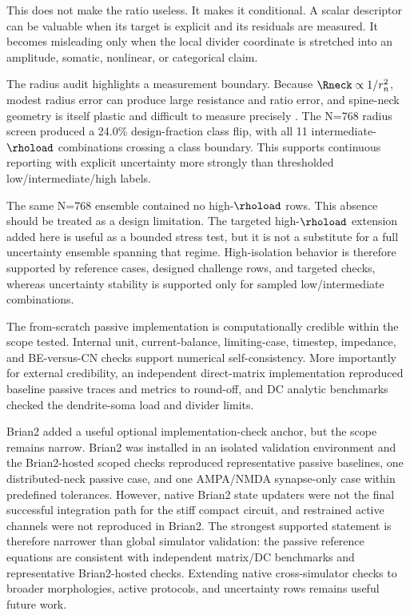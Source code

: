 This does not make the ratio useless. It makes it conditional. A scalar descriptor can be valuable when its target is explicit and its residuals are measured. It becomes misleading only when the local divider coordinate is stretched into an amplitude, somatic, nonlinear, or categorical claim.

The radius audit highlights a measurement boundary. Because $\Rneck \propto 1/r_n^2$, modest radius error can produce large resistance and ratio error, and spine-neck geometry is itself plastic and difficult to measure precisely \citep{Tonnesen2014SpineNeckPlasticity,TonnesenNagerl2016}. The N=768 radius screen produced a 24.0\% design-fraction class flip, with all 11 intermediate-$\rhoload$ combinations crossing a class boundary. This supports continuous reporting with explicit uncertainty more strongly than thresholded low/intermediate/high labels.

The same N=768 ensemble contained no high-$\rhoload$ rows. This absence should be treated as a design limitation. The targeted high-$\rhoload$ extension added here is useful as a bounded stress test, but it is not a substitute for a full uncertainty ensemble spanning that regime. High-isolation behavior is therefore supported by reference cases, designed challenge rows, and targeted checks, whereas uncertainty stability is supported only for sampled low/intermediate combinations.

The from-scratch passive implementation is computationally credible within the scope tested. Internal unit, current-balance, limiting-case, timestep, impedance, and BE-versus-CN checks support numerical self-consistency. More importantly for external credibility, an independent direct-matrix implementation reproduced baseline passive traces and metrics to round-off, and DC analytic benchmarks checked the dendrite-soma load and divider limits.

Brian2 added a useful optional implementation-check anchor, but the scope remains narrow. Brian2 was installed in an isolated validation environment and the Brian2-hosted scoped checks reproduced representative passive baselines, one distributed-neck passive case, and one AMPA/NMDA synapse-only case within predefined tolerances. However, native Brian2 state updaters were not the final successful integration path for the stiff compact circuit, and restrained active channels were not reproduced in Brian2. The strongest supported statement is therefore narrower than global simulator validation: the passive reference equations are consistent with independent matrix/DC benchmarks and representative Brian2-hosted checks. Extending native cross-simulator checks to broader morphologies, active protocols, and uncertainty rows remains useful future work.

